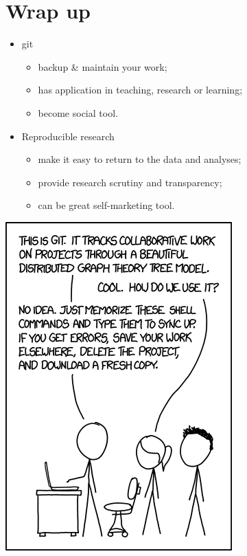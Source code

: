 \documentclass[11pt]{beamer}
\begin{document}

\section{Wrap up}

\begin{frame}
\begin{itemize}
	\item git
	\begin{itemize}
		\item backup & maintain your work;
		\item has application in teaching, research or learning;
		\item become social tool.
	\end{itemize}
	\item Reproducible research
	\begin{itemize}
		\item make it easy to return to the data and analyses;
		\item provide research scrutiny and transparency;
		\item can be great self-marketing tool.
	\end{itemize}
\end{itemize}
\end{frame}


\begin{frame}
\centering
\includegraphics[height=.8\textheight]{pic/git.png}
\end{frame}
\end{document}

